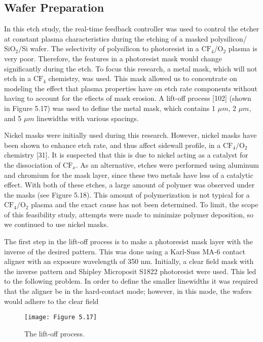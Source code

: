 \subsection{Wafer Preparation}
\tab In this etch study, the real-time feedback controller was used to control the etcher at
constant plasma characteristics during the etching of a masked polysilicon/$\text{SiO}_{2}$/Si wafer.
The selectivity of polysilicon to photoresist in a $\text{CF}_{4}/\text{O}_{2}$ plasma is very poor. Therefore, the features in a photoresist mask would change significantly during the etch. To focus
this research, a metal mask, which will not etch in a $\text{CF}_{4}$ chemistry, was used. This mask
allowed us to concentrate on modeling the effect that plasma properties have on etch rate
components without having to account for the efiects of mask erosion. A lift-off process
[102] (shown in Figure 5.17) was used to define the metal mask, which contains 1 $\mu m$, 2
$\mu m$, and 5 $\mu m$ linewidths with various spacings.


Nickel masks were initially used during this research. However, nickel masks have been
shown to enhance etch rate, and thus affect sidewall profile, in a $\text{CF}_{4}/\text{O}_{2}$ chemistry [31]. It is suspected that this is due to nickel acting as a catalyst for the dissociation of $\text{CF}_{x}$. As an alternative, etches were performed using aluminum and chromium for the mask layer, since these two metals have less of a catalytic effect. With both of these etches, a large amount of polymer was observed under the masks (see Figure 5.18). This amount of polymerization
is not typical for a $\text{CF}_{4}/\text{O}_{2}$ plasma and the exact cause has not been determined. To limit, the scope of this feasibility study, attempts were made to minimize polymer deposition, so we continued to use nickel masks.

The first step in the lift-off process is to make a photoresist mask layer with the inverse of the desired pattern. This was done using a Karl-Suss MA-6 contact aligner with an exposure wavelength of 350 nm. Initially, a clear field mask with the inverse pattern and Shipley Microposit S1822 photoresist were used. This led to the following problem. In order to define the smaller linewidths it was required that the aligner be in the hard-contact mode; however, in this mode, the wafers would adhere to the clear field 

\begin{figure}[H]
	\centering	
	\texttt{[image: Figure 5.17]}
	\bf\caption{ The lift-off process.}
	\label{fig:5.17}
\end{figure}

